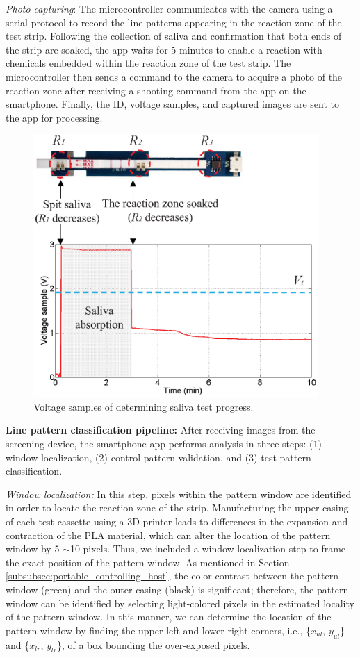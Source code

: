 \emph{Photo capturing}: The microcontroller communicates with the camera using a serial protocol to record the line patterns appearing in the reaction zone of the test strip. Following the collection of saliva and confirmation that both ends of the strip are soaked, the app waits for 5 minutes to enable a reaction with chemicals embedded within the reaction zone of the test strip. The microcontroller then sends a command to the camera to acquire a photo of the reaction zone after receiving a shooting command from the app on the smartphone. 
Finally, the ID, voltage samples, and captured images are sent to the app for processing.

\begin{figure}[ht]
\begin{center}
\includegraphics[height=10cm]{image/ket/saliva_absorb.eps}
\caption{Voltage samples of determining saliva test progress.}
\label{fig:saliva_absorb}
\end{center}
\end{figure}


\textbf{Line pattern classification pipeline:}
\newline
After receiving images from the screening device, the smartphone app performs analysis in three steps: (1) window localization, (2) control pattern validation, and (3) test pattern classification.

\emph{Window localization: }
In this step, pixels within the pattern window are identified in order to locate the reaction zone of the strip. Manufacturing the upper casing of each test cassette using a 3D printer leads to differences in the expansion and contraction of the PLA material, which can alter the location of the pattern window by 5 $\sim$10 pixels. Thus, we included a window localization step to frame the exact position of the pattern window. As mentioned in Section \ref{subsubsec:portable_controlling_host}, the color contrast between the pattern window (green) and the outer casing (black) is significant; therefore, the pattern window can be identified by selecting light-colored pixels in the estimated locality of the pattern window. In this manner, we can determine the location of the pattern window by finding the upper-left and lower-right corners, i.e., \{$x_{ul}$, $y_{ul}$\} and \{$x_{lr}$, $y_{lr}$\}, of a box bounding the over-exposed pixels.

